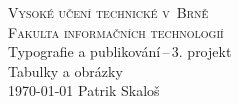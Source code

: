 \documentclass[a4paper, 11pt]{article}
\begin{document}
  \begin{titlepage}
    \begin{center}
      \Huge
      \textsc{Vysoké učení technické v~Brně} \\
      \huge\textsc{Fakulta informačních technologií} \\
      \LARGE
      Typografie a publikování\,--\,3. projekt\\
      \Huge
      Tabulky a obrázky\\
      {\Large \today\hfill
      Patrik Skaloš}
    \end{center}
  \end{titlepage}
\end{document}
